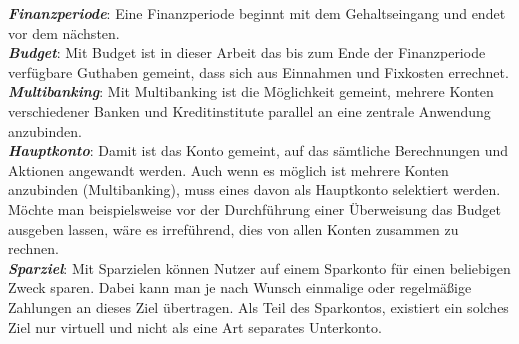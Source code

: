 \textbf{\textit{Finanzperiode}}: Eine Finanzperiode beginnt mit dem Gehaltseingang und endet vor dem nächsten. \\
\textbf{\textit{Budget}}: Mit Budget ist in dieser Arbeit das bis zum Ende der Finanzperiode verfügbare Guthaben gemeint, dass sich aus Einnahmen und Fixkosten errechnet.\\
\textbf{\textit{Multibanking}}: Mit Multibanking ist die Möglichkeit gemeint, mehrere Konten verschiedener Banken und Kreditinstitute parallel an eine zentrale Anwendung anzubinden.\\
\textbf{\textit{Hauptkonto}}: Damit ist das Konto gemeint, auf das sämtliche Berechnungen und Aktionen angewandt werden. Auch wenn es möglich ist mehrere Konten anzubinden (\vgl Multibanking), muss eines davon als Hauptkonto selektiert werden. Möchte man beispielsweise vor der Durchführung einer Überweisung das Budget ausgeben lassen, wäre es irreführend, dies von allen Konten zusammen zu rechnen.\\
\textbf{\textit{Sparziel}}: Mit Sparzielen können Nutzer auf einem Sparkonto für einen beliebigen Zweck sparen. Dabei kann man je nach Wunsch einmalige oder regelmäßige Zahlungen an dieses Ziel übertragen. Als Teil des Sparkontos, existiert ein solches Ziel nur virtuell und nicht als eine Art separates Unterkonto.